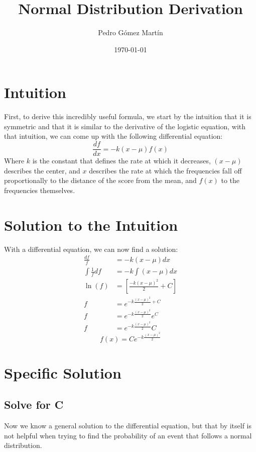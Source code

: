 \documentclass{article}
\author{Pedro G\'{o}mez Mart\'{i}n}
\date{\today}
\title{Normal Distribution Derivation}
\begin{document}
\maketitle

\section{Intuition}

First, to derive this incredibly useful formula, we start by the intuition that
it is symmetric and that it is similar to the derivative of the logistic
equation, with that intuition, we can come up with the following differential
equation:
\begin{equation}
  \label{eq:Differential equation intuition}
  \frac{df}{dx}=-k(x-\mu)f(x)
\end{equation}
Where $k$ is the constant that defines the rate at which it decreases, $(x-\mu)$
describes the center, and $x$ describes the rate at which the frequencies
fall off proportionally to the distance of the score from the mean, and $f(x)$
to the frequencies themselves.

\section{Solution to the Intuition}
With a differential equation, we can now find a solution:
\begin{align}
  \frac{df}{f}&=-k(x-\mu)dx\\
  \int\frac{1}{f}df&=-k\int (x-\mu)dx\\
  \ln (f)&=\left[ \frac{-k(x-\mu)^2}{2} +C \right]\\
  f&=e^{-k\frac{\left(x-\mu\right)^2}{2}+C}\\
  f&=e^{-k\frac{\left(x-\mu\right)^2}{2}}e^C\\
  f&=e^{-k\frac{\left(x-\mu\right)^2}{2}}C
\end{align}
\begin{equation*}
  \label{eq:General Solution}
  f(x)=Ce^{-k\frac{\left(x-\mu\right)^2}{2}}
\end{equation*}

\section{Specific Solution}
\subsection{Solve for C}
Now we know a general solution to the differential equation, but that by itself
is not helpful when trying to find the probability of an event that follows a
normal distribution.
\end{document}
